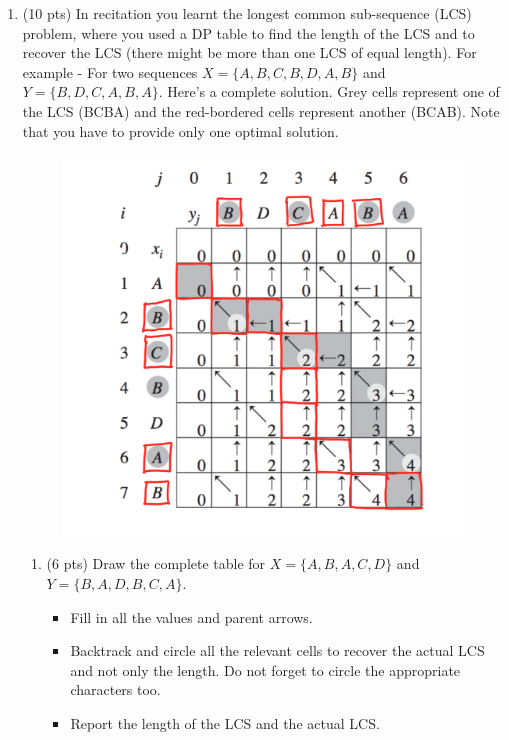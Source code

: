 \documentclass[12pt]{article}
\theoremstyle{remark}
\begin{document}
\begin{enumerate}
\pagebreak
\item (10 pts) In recitation you learnt the longest common sub-sequence (LCS) problem, where you used a DP table to find the length of the LCS and to recover the LCS (there might be more than one LCS of equal length).
For example - For two sequences $X = \{A, B, C, B, D, A, B\}$ and $Y = \{B, D, C, A, B, A\}$. Here's a complete solution. Grey cells represent one of the LCS (BCBA) and the red-bordered cells represent another (BCAB). Note that you have to provide only one optimal solution.

\begin{figure}[h!]
\begin{center}
\includegraphics[scale=0.3]{LCS.jpeg} 
\end{center}
\end{figure}

\begin{enumerate}
    \item (6 pts) Draw the complete table for $X = \{A,B,A,C,D\}$ and $Y = \{B,A,D,B,C,A\}$.
    \begin{itemize}
        \item Fill in all the values and parent arrows.
        \item Backtrack and circle all the relevant cells to recover the actual LCS and not only the length. Do not forget to circle the appropriate characters too.
        \item Report the length of the LCS and the actual LCS.
    \end{itemize}
    

\end{enumerate}
\end{enumerate}
\end{document}
